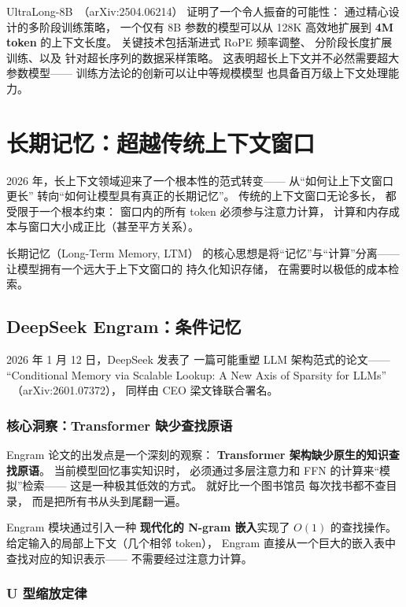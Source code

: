UltraLong-8B~\cite{ultralong2025}（arXiv:2504.06214）
证明了一个令人振奋的可能性：
通过精心设计的多阶段训练策略，
一个仅有 8B 参数的模型可以从 128K
高效地扩展到 \textbf{4M token} 的上下文长度。
关键技术包括渐进式 RoPE 频率调整、
分阶段长度扩展训练、以及
针对超长序列的数据采样策略。
这表明超长上下文并不必然需要超大参数模型——
训练方法论的创新可以让中等规模模型
也具备百万级上下文处理能力。

\section{长期记忆：超越传统上下文窗口}
\label{sec:long-term-memory}

2026 年，长上下文领域迎来了一个根本性的范式转变——
从``如何让上下文窗口更长''
转向``如何让模型具有真正的长期记忆''。
传统的上下文窗口无论多长，
都受限于一个根本约束：
窗口内的所有 token 必须参与注意力计算，
计算和内存成本与窗口大小成正比（甚至平方关系）。

长期记忆（Long-Term Memory, LTM）
的核心思想是将``记忆''与``计算''分离——
让模型拥有一个远大于上下文窗口的
持久化知识存储，
在需要时以极低的成本检索。

\subsection{DeepSeek Engram：条件记忆}

2026 年 1 月 12 日，DeepSeek 发表了
一篇可能重塑 LLM 架构范式的论文——
``Conditional Memory via Scalable Lookup:
A New Axis of Sparsity for LLMs''
~\cite{engram2026}（arXiv:2601.07372），
同样由 CEO 梁文锋联合署名。

\subsubsection{核心洞察：Transformer 缺少查找原语}

Engram 论文的出发点是一个深刻的观察：
\textbf{Transformer 架构缺少原生的知识查找原语}。
当前模型回忆事实知识时，
必须通过多层注意力和 FFN 的计算来``模拟''检索——
这是一种极其低效的方式。
就好比一个图书馆员
每次找书都不查目录，
而是把所有书从头到尾翻一遍。

Engram 模块通过引入一种
\textbf{现代化的 N-gram 嵌入}实现了 $O(1)$ 的查找操作。
给定输入的局部上下文（几个相邻 token），
Engram 直接从一个巨大的嵌入表中
查找对应的知识表示——
不需要经过注意力计算。

\subsubsection{U 型缩放定律}

